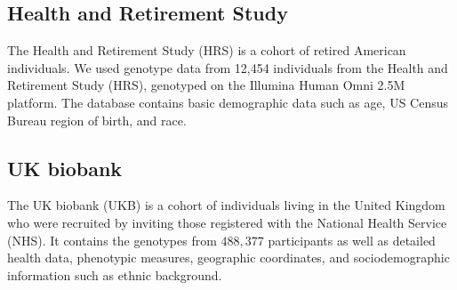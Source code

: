 \subsection{Health and Retirement Study}

The Health and Retirement Study (HRS) is a cohort of retired American individuals\citep{juster_overview_1995}. We used genotype data from 12,454 individuals from the Health and Retirement Study (HRS), genotyped on the Illumina Human Omni 2.5M platform. The database contains basic demographic data such as age, US Census Bureau region of birth, and race.

\subsection{UK biobank}

The UK biobank (UKB) is a cohort of individuals living in the United Kingdom who were recruited by inviting those registered with the National Health Service (NHS)\citep{sudlow_uk_2015}. It contains the genotypes from $488,377$ participants as well as detailed health data, phenotypic measures, geographic coordinates, and sociodemographic information such as ethnic background.




